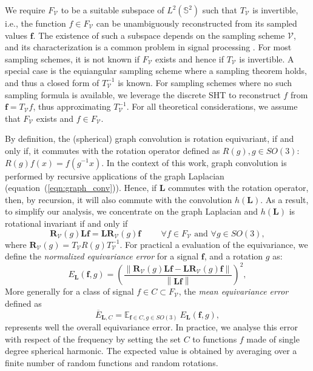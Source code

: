 \documentclass{article} %
\newcommand{\norm}[1]{\left\lVert#1\right\rVert}
\renewcommand{\b}[1]{{\bm{#1}}}  %
\renewcommand{\S}{\mathbb{S}}
\newcommand{\V}{\mathcal{V}}  %
\newcommand{\eqnref}[1]{equation~(\ref{eqn:#1})}
\begin{document}
We require $F_\V$ to be a suitable subspace of $L^2(\S^2)$ such that $T_\V$ is invertible, i.e., the function $f \in F_\V$ can be unambiguously reconstructed from its sampled values $\b{f}$.
The existence of such a subspace depends on the sampling scheme $\V$, and its characterization is a common problem in signal processing \citep{driscoll1994Fouriersphere}.
For most sampling schemes, it is not known if $F_\V$ exists and hence if $T_\V$ is invertible.
A special case is the equiangular sampling scheme where a sampling theorem holds, and thus a closed form of $T_\V^{-1}$ is known. %
For sampling schemes where no such sampling formula is available, we leverage the discrete SHT to reconstruct $f$ from $\b{f}=T_\V f$, thus approximating $T_\V^{-1}$.
For all theoretical considerations, we assume that $F_\V$ exists and $f \in F_\V$.

By definition, the (spherical) graph convolution is rotation equivariant, if and only if, it commutes with the rotation operator defined as $R(g), g\in SO(3)$: $R(g) f(x) = f\left(g^{-1} x \right)$.
In the context of this work, graph convolution is performed by recursive applications of the graph Laplacian (\eqnref{graph_conv}).
Hence, if $\b{L}$ commutes with the rotation operator, then, by recursion, it will also commute with the convolution $h(\b{L})$.
As a result, to simplify our analysis, we concentrate on the graph Laplacian and $h(\b{L})$ is rotational invariant if and only if
\begin{equation} \label{eq:equivariance}
	\b{R}_\V(g) \b{L} \b{f} = \b{L} \b{R}_\V(g) \b{f} \hspace{1cm} \forall f\in F_\V \text{ and } \forall g\in SO(3),
\end{equation}
where $\b{R}_\V(g) = T_\V R(g) T_\V^{-1}$. For practical a evaluation of the equivariance, we define the \textit{normalized equivariance error} for a signal $\b{f}$, and a  rotation $g$ as:
\begin{equation} \label{eq:equivariance error}
	E_{\b{L}}(\b{f}, g) = \left(\frac{ \norm {\b{R}_\V(g) \b{L} \b{f} - \b{L} \b{R}_\V(g) \b{f}} }{\norm {\b{L} \b{f}}}\right)^2,
\end{equation}
More generally for a class of signal $f \in C \subset F_\V$, the \textit{mean equivariance error} defined as
\begin{equation} \label{eq:mean equivariance error}
	\overline E_{\b{L}, C} = \mathbb E_{\b{f}\in C, g\in SO(3)} \ E_{\b{L}}(\b{f}, g),
\end{equation}
represents well the overall equivariance error.
In practice, we analyse this error with respect of the frequency by setting the set $C$ to functions $f$ made of single degree spherical harmonic.
The expected value is obtained by averaging over a finite number of random functions and random rotations.
\end{document}
